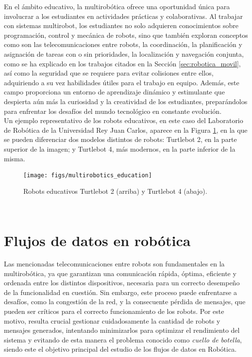 En el ámbito educativo, la multirobótica ofrece una oportunidad única para
involucrar a los estudiantes en actividades prácticas y colaborativas.
Al trabajar con sistemas multirobot, los estudiantes no solo adquieren
conocimientos sobre programación, control y mecánica de robots, sino que también
exploran conceptos como son las telecomunicaciones entre robots, la coordinación,
la planificación y asignación de tareas con o sin prioridades, la localización y
navegación conjunta, como se ha explicado en los trabajos citados en la Sección
\ref{sec:robotica_movil}, así como la seguridad que se requiere para evitar
colisiones entre ellos, adquiriendo a su vez habilidades útiles para el trabajo
en equipo.
Además, este campo proporciona un entorno de aprendizaje dinámico y estimulante
que despierta aún más la curiosidad y la creatividad de los estudiantes,
preparándolos para enfrentar los desafíos del mundo tecnológico en constante
evolución.
\\

Un ejemplo representativo de los robots educativos, en este caso del Laboratorio
de Robótica de la Universidad Rey Juan Carlos, aparece en la Figura
\ref{fig:robots_education}, en la que se pueden diferenciar dos modelos
distintos de robots: Turtlebot 2, en la parte superior de la imagen; y Turtlebot
4, más modernos, en la parte inferior de la misma.

\begin{figure} [h!]
  \begin{center}
    \texttt{[image: figs/multirobotics\_education]}
  \end{center}
  \caption{Robots educativos Turtlebot 2 (arriba) y Turtlebot 4 (abajo).}
  \label{fig:robots_education}
\end{figure}\



\section{Flujos de datos en robótica}
\label{sec:flujos_datos} %

Las mencionadas telecomunicaciones entre robots son fundamentales en la
multirobótica, ya que garantizan una comunicación rápida, óptima, eficiente y
ordenada entre los distintos dispositivos, necesaria para un correcto desempeño
de la funcionalidad en cuestión.
Sin embargo, este proceso puede enfrentarse a desafíos, como la congestión de la
red, y la consecuente pérdida de mensajes, que pueden ser críticos para el
correcto funcionamiento de los robots.
Por este motivo, resulta crucial gestionar cuidadosamente la cantidad de robots
y mensajes generados, intentando minimizarlos para optimizar el rendimiento del
sistema y evitando de esta manera el problema conocido como \textit{cuello de
botella}, siendo este el objetivo principal del estudio de los flujos de datos
en Robótica.
\\

